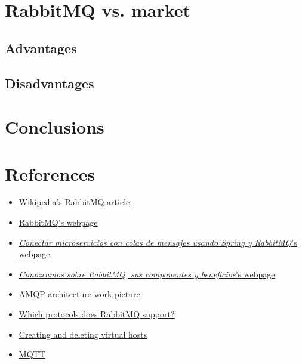 \documentclass[4paper,12pt]{article}
\begin{document}
\section*{RabbitMQ vs. market}
\justify{}

\newpage

\subsection*{Advantages}
\justify{}

\subsection*{Disadvantages}
\justify{}

\section*{Conclusions}
\justify{}

\section*{References}
\begin{itemize}
    \item \href{https://en.wikipedia.org/wiki/RabbitMQ}{\underline{Wikipedia's RabbitMQ article}}
    \item \href{https://www.rabbitmq.com}{\underline{RabbitMQ's webpage}}
    \item \href{https://www.sdos.es/blog/microservicios-mensajes-spring-rabbitmq}{\underline{\textit{Conectar microservicios con colas de mensajes usando Spring y RabbitMQ}'s webpage}}
    \item \href{https://www.pragma.com.co/academia/lecciones/conozcamos-sobre-rabbitmq-sus-componentes-y-beneficios}{\underline{\textit{Conozcamos sobre RabbitMQ, sus componentes y beneficios}'s webpage}}
    \item \href{https://www.researchgate.net/publication/325119432/figure/fig5/AS:626093459505153@1526283721309/AMQP-architecture-34.png}{\underline{AMQP architecture work picture}}
    \item \href{https://www.rabbitmq.com/protocols.html}{\underline{Which protocols does RabbitMQ support?}}
    \item \href{https://www.rabbitmq.com/vhosts.html}{\underline{Creating and deleting virtual hosts}}
    \item \href{https://www.luisllamas.es/que-es-mqtt-su-importancia-como-protocolo-iot/}{MQTT}
\end{itemize}
\end{document}
